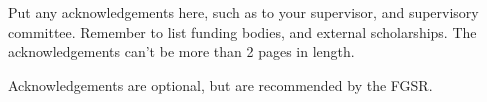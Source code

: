 \documentclass[\main/thesis.tex]{subfiles}
\begin{document}
\begin{acknowledgements} 
Put any acknowledgements here, such as to your supervisor, and supervisory committee.
Remember to list funding bodies, and external scholarships.
The acknowledgements can't be more than 2 pages in length.

Acknowledgements are optional, but are recommended by the FGSR.
\end{acknowledgements}
\end{document}
